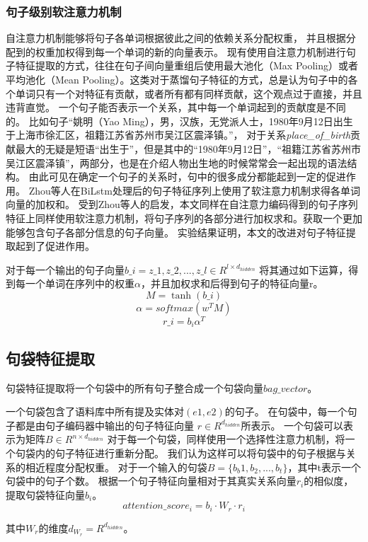 \documentclass[UTF8]{csoarticle}
\begin{document}
\subsubsection{句子级别软注意力机制}
自注意力机制能够将句子各单词根据彼此之间的依赖关系分配权重，
并且根据分配到的权重加权得到每一个单词的新的向量表示。
现有使用自注意力机制进行句子特征提取的方式，往往在句子间向量重组后使用最大池化（Max Pooling）或者平均池化（Mean Pooling）。这类对于蒸馏句子特征的方式，总是认为句子中的各个单词只有一个对特征有贡献，或者所有都有同样贡献，这个观点过于直接，并且违背直觉。
一个句子能否表示一个关系，其中每一个单词起到的贡献度是不同的。
比如句子“姚明（Yao Ming），男，汉族，无党派人士，1980年9月12日出生于上海市徐汇区，祖籍江苏省苏州市吴江区震泽镇。”，
对于关系\textit{place\_of\_birth}贡献最大的无疑是短语“出生于”，但是其中的“1980年9月12日”，“祖籍江苏省苏州市吴江区震泽镇”，两部分，也是在介绍人物出生地的时候常常会一起出现的语法结构。
由此可见在确定一个句子的关系时，句中的很多成分都能起到一定的促进作用。
Zhou\cite{bib4}等人在BiLstm处理后的句子特征序列上使用了软注意力机制求得各单词向量的加权和。
受到Zhou等人的启发，本文同样在自注意力编码得到的句子序列特征上同样使用软注意力机制，将句子序列的各部分进行加权求和。获取一个更加能够包含句子各部分信息的句子向量。
实验结果证明，本文的改进对句子特征提取起到了促进作用。

对于每一个输出的句子向量$ b\_i = {z\_1, z\_2,...,z\_l} \in R^{l \times d_{hidden}} $
将其通过如下运算，得到每一个单词在序列中的权重$\alpha$，并且加权求和后得到句子的特征向量r。
\[ M= \tanh(b\_i) \]
\[ \alpha = softmax(w^T M) \]
\[ r\_i = b_i \alpha^T \]

\subsection{句袋特征提取}
句袋特征提取将一个句袋中的所有句子整合成一个句袋向量$bag\_vector$。

一个句袋包含了语料库中所有提及实体对$(e1, e2)$的句子。
在句袋中，每一个句子都是由句子编码器中输出的句子特征向量 $r \in R^{d_{hidden}}$所表示。
一个句袋可以表示为矩阵$B \in R^{n \times d_{hidden}}$
对于每一个句袋，同样使用一个选择性注意力机制，将一个句袋内的句子特征进行重新分配。
我们认为这样可以将句袋中的句子根据与关系的相近程度分配权重。
对于一个输入的句袋$B = \{b_b1, b_2,...,b_t\}$，其中t表示一个句袋中的句子个数。
根据一个句子特征向量相对于其真实关系向量$r_i$的相似度，提取句袋特征向量$b_i$。
\[attention\_score_i =  b_i\cdot W_r \cdot r_i\]

其中$W_r$的维度$d_{W_r} = R^{d_{hidden}}$。
\end{document}
